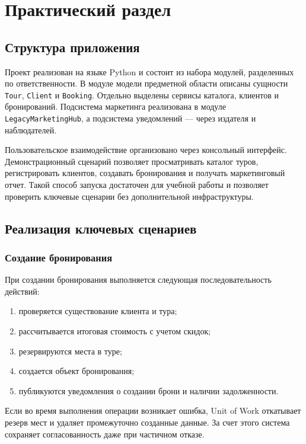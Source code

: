 \chapter{Практический раздел}

\section{Структура приложения}

Проект реализован на языке Python и состоит из набора модулей, разделенных по
ответственности. В модуле модели предметной области описаны сущности
\texttt{Tour}, \texttt{Client} и \texttt{Booking}. Отдельно выделены сервисы
каталога, клиентов и бронирований. Подсистема маркетинга реализована в модуле
\texttt{LegacyMarketingHub}, а подсистема уведомлений --- через издателя и
наблюдателей.

Пользовательское взаимодействие организовано через консольный интерфейс.
Демонстрационный сценарий позволяет просматривать каталог туров, регистрировать
клиентов, создавать бронирования и получать маркетинговый отчет. Такой способ
запуска достаточен для учебной работы и позволяет проверить ключевые сценарии
без дополнительной инфраструктуры.

\section{Реализация ключевых сценариев}

\subsection{Создание бронирования}

При создании бронирования выполняется следующая последовательность действий:

\begin{enumerate}
    \item проверяется существование клиента и тура;
    \item рассчитывается итоговая стоимость с учетом скидок;
    \item резервируются места в туре;
    \item создается объект бронирования;
    \item публикуются уведомления о создании брони и наличии задолженности.
\end{enumerate}

Если во время выполнения операции возникает ошибка, Unit of Work откатывает
резерв мест и удаляет промежуточно созданные данные. За счет этого система
сохраняет согласованность даже при частичном отказе.

